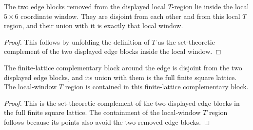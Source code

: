 \begin{lemma}%
    \label{lem:peps_normalSquareRegionT_window_complement}
    \leanok
    The two edge blocks removed from the displayed local $T$-region lie inside
    the local $5\times6$ coordinate window. They are disjoint from each other
    and from this local $T$ region, and their union with it is exactly that
    local window.
\end{lemma}
\begin{proof}\leanok
    This follows by unfolding the definition of $T$ as the set-theoretic
    complement of the two displayed edge blocks inside the local window.
\end{proof}

\begin{lemma}%
    \label{lem:peps_normalSquareEdgeComplementRegion}
    \leanok
    The finite-lattice complementary block around the edge is disjoint from
    the two displayed edge blocks, and its union with them is the full finite
    square lattice. The local-window $T$ region is contained in this
    finite-lattice complementary block.
\end{lemma}
\begin{proof}\leanok
    This is the set-theoretic complement of the two displayed edge blocks in
    the full finite square lattice. The containment of the local-window
    $T$ region follows because its points also avoid the two removed edge
    blocks.
\end{proof}

